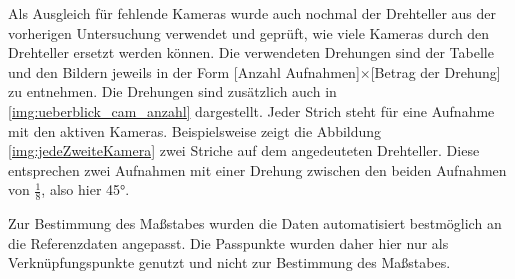 \documentclass[./00PhotoBox.tex]{subfiles}
\begin{document}
Als Ausgleich für fehlende Kameras wurde auch nochmal der Drehteller aus der vorherigen Untersuchung verwendet und geprüft, wie viele Kameras durch den Drehteller ersetzt werden können. Die verwendeten Drehungen sind der Tabelle und den Bildern jeweils in der Form [Anzahl Aufnahmen]$\times$[Betrag der Drehung] zu entnehmen. Die Drehungen sind zusätzlich auch in \autoref{img:ueberblick_cam_anzahl} dargestellt. Jeder Strich steht für eine Aufnahme mit den aktiven Kameras. Beispielsweise zeigt die Abbildung \autoref{img:jedeZweiteKamera} zwei Striche auf dem angedeuteten Drehteller. Diese entsprechen zwei Aufnahmen mit einer Drehung zwischen den beiden Aufnahmen von $\frac{1}{8}$, also hier \ang{45}.

Zur Bestimmung des Maßstabes wurden die Daten automatisiert bestmöglich an die Referenzdaten angepasst. Die Passpunkte wurden daher hier nur als Verknüpfungspunkte genutzt und nicht zur Bestimmung des Maßstabes.
\end{document}
